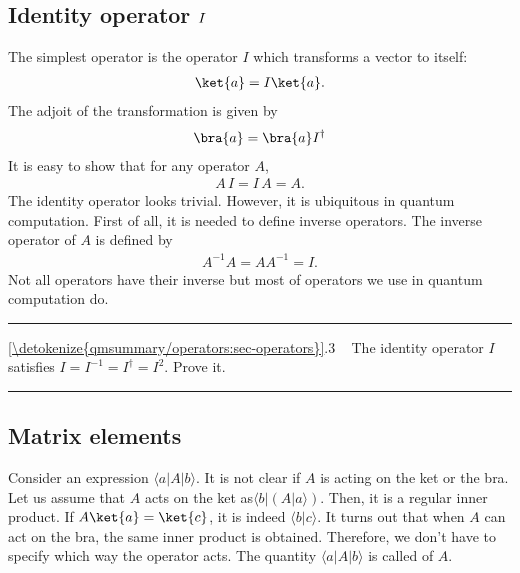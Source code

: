 \documentclass[letterpaper,10pt,english]{jupyterBook}
\begin{document}
\subsection{Identity operator \protect\(I\protect\)}
\label{\detokenize{qmsummary/operators:identity-operator-i}}
\sphinxAtStartPar
The simplest operator is the  operator \(I\) which transforms a vector to itself:
\begin{equation*}
\begin{split}
\ket{a} = I \ket{a}.
\end{split}
\end{equation*}
\sphinxAtStartPar
The adjoit of the transformation is given by
\begin{equation*}
\begin{split}
\bra{a} = \bra{a} I^\dagger
\end{split}
\end{equation*}
\sphinxAtStartPar
It is easy to show that for any operator \(A\),
\begin{equation*}
\begin{split}
A\,I = I\, A = A.
\end{split}
\end{equation*}
\sphinxAtStartPar
The identity operator looks trivial.  However, it is ubiquitous in quantum computation. First of all, it is needed to define inverse operators.  The inverse operator of \(A\) is defined by
\begin{equation*}
\begin{split}
A^{-1} A = A A^{-1} = I.
\end{split}
\end{equation*}
\sphinxAtStartPar
Not all operators have their inverse but most of operators we use in quantum computation do.


\bigskip\hrule\bigskip


\sphinxAtStartPar
{} \hyperref[\detokenize{qmsummary/operators:sec-operators}]{\ref{\detokenize{qmsummary/operators:sec-operators}}}.3     The identity operator \(I\) satisfies \(I = I^{-1} = I^\dagger = I^2\).  Prove it.


\bigskip\hrule\bigskip



\subsection{Matrix elements}
\label{\detokenize{qmsummary/operators:matrix-elements}}
\sphinxAtStartPar
Consider an expression \(\langle a | A | b \rangle\).  It is not clear if \(A\) is acting on the ket or the bra. Let us assume that \(A\) acts on the ket as\(\langle b | (A | a \rangle)\).  Then, it is a regular inner product.  If \(A \ket{a}=\ket{c}\), it is indeed \(\langle  b|c \rangle\).  It turns out that when \(A\) can act on the bra, the same inner product is obtained.  Therefore, we don’t have to specify which way the operator acts.  The quantity \(\langle a | A | b \rangle\) is called  of \(A\).
\end{document}
